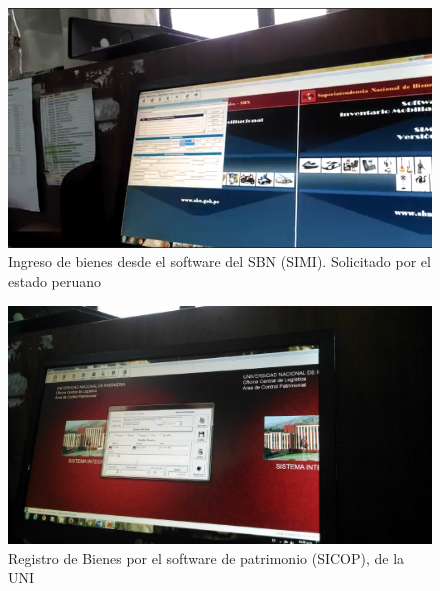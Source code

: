 \begin{figure}[h!]
  \centering
  \includegraphics[scale=0.4]{images/activities/camila/simi.png}
  \caption{Ingreso de bienes desde el software del SBN (SIMI). Solicitado por el estado peruano}
  \label{fig:simi}
\end{figure}

\begin{figure}[h!]
  \centering
  \includegraphics[scale=0.15]{images/activities/camila/sicop.jpg}
  \caption{Registro de Bienes por el software de patrimonio (SICOP), de la UNI}
  \label{fig:sicop}
\end{figure}

